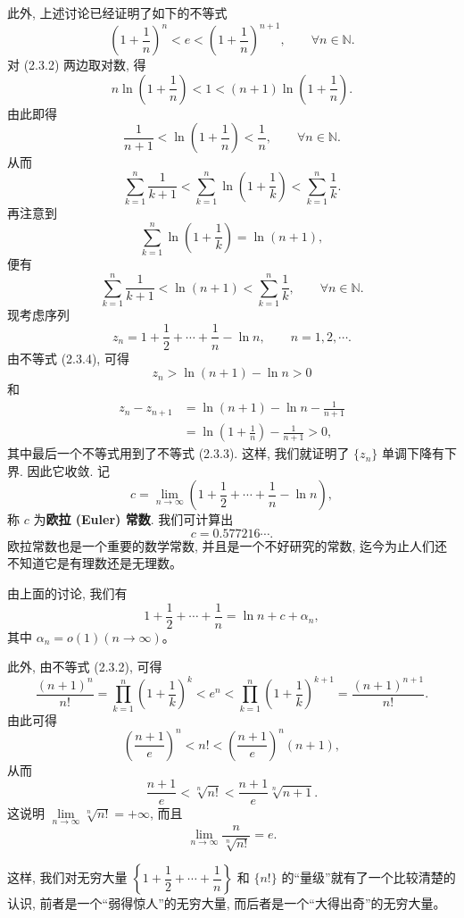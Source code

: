 \documentclass[UTF8, 12pt, fontset=fandol, oneside]{ctexart}
\begin{document}
此外, 上述讨论已经证明了如下的不等式
\begin{equation}
  \left(1+\frac1n\right)^n
  <
  e
  <
  \left(1+\frac1n\right)^{n+1},
  \qquad \forall n\in\mathbb{N}.
  \tag{2.3.2}
\end{equation}
对 (2.3.2) 两边取对数, 得
\[
  n\ln\left(1+\frac1n\right)
  <
  1
  <
  (n+1)\ln\left(1+\frac1n\right).
\]
由此即得
\begin{equation}
  \frac1{n+1}
  <
  \ln\left(1+\frac1n\right)
  <
  \frac1n,\qquad \forall n\in\mathbb{N}.
  \tag{2.3.3}
\end{equation}
从而
\[
  \sum_{k=1}^n\frac1{k+1}
  <
  \sum_{k=1}^n\ln\left(1+\frac1k\right)
  <
  \sum_{k=1}^n\frac1k.
\]
再注意到
\[
  \sum_{k=1}^n\ln\left(1+\frac1k\right)=\ln(n+1),
\]
便有
\begin{equation}
  \sum_{k=1}^n\frac1{k+1}
  <
  \ln(n+1)
  <
  \sum_{k=1}^n\frac1k,\qquad \forall n\in\mathbb{N}.
  \tag{2.3.4}
\end{equation}
现考虑序列
\[
  z_n=1+\frac12+\cdots+\frac1n-\ln n,\qquad n=1,2,\cdots.
\]
由不等式 (2.3.4), 可得
\[
  z_n>\ln(n+1)-\ln n>0
\]
和
\[
\begin{aligned}
  z_n-z_{n+1}
  &=
  \ln(n+1)-\ln n-\frac1{n+1}\\
  &=
  \ln\left(1+\frac1n\right)-\frac1{n+1}>0,
\end{aligned}
\]
其中最后一个不等式用到了不等式 (2.3.3). 这样, 我们就证明了 $\{z_n\}$ 单调下降有下界. 因此它收敛. 记
\[
  c=\lim_{n\to\infty}\left(1+\frac12+\cdots+\frac1n-\ln n\right),
\]
称 $c$ 为\textbf{欧拉 (Euler) 常数}. 我们可计算出
\[
  c=0.577216\cdots.
\]
欧拉常数也是一个重要的数学常数, 并且是一个不好研究的常数, 迄今为止人们还不知道它是有理数还是无理数。

由上面的讨论, 我们有
\[
  1+\frac12+\cdots+\frac1n=\ln n+c+\alpha_n,
\]
其中 $\alpha_n=o(1)(n\to\infty)$。

此外, 由不等式 (2.3.2), 可得
\[
  \frac{(n+1)^n}{n!}
  =
  \prod_{k=1}^n\left(1+\frac1k\right)^k
  <
  e^n
  <
  \prod_{k=1}^n\left(1+\frac1k\right)^{k+1}
  =
  \frac{(n+1)^{n+1}}{n!}.
\]
由此可得
\[
  \left(\frac{n+1}{e}\right)^n<n!<\left(\frac{n+1}{e}\right)^n(n+1),
\]
从而
\[
  \frac{n+1}{e}<\sqrt[n]{n!}<\frac{n+1}{e}\sqrt[n]{n+1}.
\]
这说明 $\lim\limits_{n\to\infty}\sqrt[n]{n!}=+\infty$, 而且
\[
  \lim_{n\to\infty}\frac n{\sqrt[n]{n!}}=e.
\]

这样, 我们对无穷大量 $\left\{1+\dfrac12+\cdots+\dfrac1n\right\}$ 和 $\{n!\}$ 的``量级''就有了一个比较清楚的认识, 前者是一个``弱得惊人''的无穷大量, 而后者是一个``大得出奇''的无穷大量。
\end{document}
